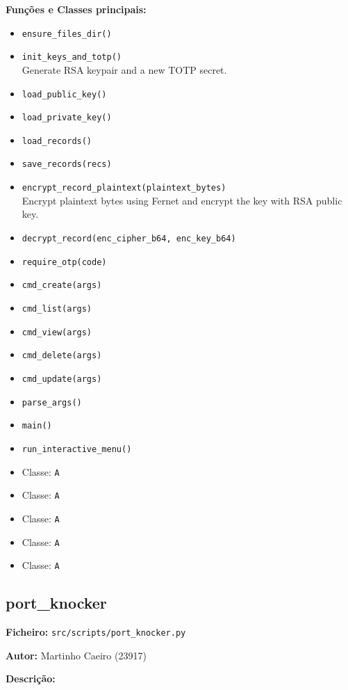 \documentclass[a4paper,11pt]{article}
\begin{document}
\textbf{Funções e Classes principais:}
\begin{itemize}
    \item \texttt{ensure\_files\_dir()}
    \item \texttt{init\_keys\_and\_totp()}
    \\ Generate RSA keypair and a new TOTP secret.
    \item \texttt{load\_public\_key()}
    \item \texttt{load\_private\_key()}
    \item \texttt{load\_records()}
    \item \texttt{save\_records(recs)}
    \item \texttt{encrypt\_record\_plaintext(plaintext\_bytes)}
    \\ Encrypt plaintext bytes using Fernet and encrypt the key with RSA public key.
    \item \texttt{decrypt\_record(enc\_cipher\_b64, enc\_key\_b64)}
    \item \texttt{require\_otp(code)}
    \item \texttt{cmd\_create(args)}
    \item \texttt{cmd\_list(args)}
    \item \texttt{cmd\_view(args)}
    \item \texttt{cmd\_delete(args)}
    \item \texttt{cmd\_update(args)}
    \item \texttt{parse\_args()}
    \item \texttt{main()}
    \item \texttt{run\_interactive\_menu()}
    \item Classe: \texttt{A}
    \item Classe: \texttt{A}
    \item Classe: \texttt{A}
    \item Classe: \texttt{A}
    \item Classe: \texttt{A}
\end{itemize}

\newpage
\subsection{port\_knocker}
\label{sec:port_knocker}

\textbf{Ficheiro:} \texttt{src/scripts/port\_knocker.py}

\textbf{Autor:} Martinho Caeiro (23917)

\textbf{Descrição:}
\end{document}
